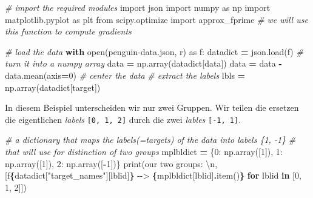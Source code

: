 \documentclass[
]{book}
\newenvironment{Shaded}{\begin{snugshade}}{\end{snugshade}}
\newcommand{\BuiltInTok}[1]{#1}
\newcommand{\CharTok}[1]{\textcolor[rgb]{0.31,0.60,0.02}{#1}}
\newcommand{\CommentTok}[1]{\textcolor[rgb]{0.56,0.35,0.01}{\textit{#1}}}
\newcommand{\ControlFlowTok}[1]{\textcolor[rgb]{0.13,0.29,0.53}{\textbf{#1}}}
\newcommand{\DecValTok}[1]{\textcolor[rgb]{0.00,0.00,0.81}{#1}}
\newcommand{\ImportTok}[1]{#1}
\newcommand{\KeywordTok}[1]{\textcolor[rgb]{0.13,0.29,0.53}{\textbf{#1}}}
\newcommand{\NormalTok}[1]{#1}
\newcommand{\OperatorTok}[1]{\textcolor[rgb]{0.81,0.36,0.00}{\textbf{#1}}}
\newcommand{\SpecialCharTok}[1]{\textcolor[rgb]{0.81,0.36,0.00}{\textbf{#1}}}
\newcommand{\SpecialStringTok}[1]{\textcolor[rgb]{0.31,0.60,0.02}{#1}}
\newcommand{\StringTok}[1]{\textcolor[rgb]{0.31,0.60,0.02}{#1}}
\theoremstyle{definition}
\theoremstyle{definition}
\theoremstyle{definition}
\theoremstyle{definition}
\theoremstyle{remark}
\begin{document}
\begin{Shaded}
\begin{Highlighting}[]
\CommentTok{\# import the required modules}
\ImportTok{import}\NormalTok{ json}
\ImportTok{import}\NormalTok{ numpy }\ImportTok{as}\NormalTok{ np}
\ImportTok{import}\NormalTok{ matplotlib.pyplot }\ImportTok{as}\NormalTok{ plt}
\ImportTok{from}\NormalTok{ scipy.optimize }\ImportTok{import}\NormalTok{ approx\_fprime  }\CommentTok{\# we will use this function to compute gradients}

\CommentTok{\# load the data}
\ControlFlowTok{with} \BuiltInTok{open}\NormalTok{(}\StringTok{\textquotesingle{}penguin{-}data.json\textquotesingle{}}\NormalTok{, }\StringTok{\textquotesingle{}r\textquotesingle{}}\NormalTok{) }\ImportTok{as}\NormalTok{ f:}
\NormalTok{    datadict }\OperatorTok{=}\NormalTok{ json.load(f)}
\CommentTok{\# turn it into a numpy array}
\NormalTok{data }\OperatorTok{=}\NormalTok{ np.array(datadict[}\StringTok{\textquotesingle{}data\textquotesingle{}}\NormalTok{])}
\NormalTok{data }\OperatorTok{=}\NormalTok{ data }\OperatorTok{{-}}\NormalTok{ data.mean(axis}\OperatorTok{=}\DecValTok{0}\NormalTok{)  }\CommentTok{\# center the data}
\CommentTok{\# extract the labels}
\NormalTok{lbls }\OperatorTok{=}\NormalTok{ np.array(datadict[}\StringTok{\textquotesingle{}target\textquotesingle{}}\NormalTok{])}
\end{Highlighting}
\end{Shaded}

In diesem Beispiel unterscheiden wir nur zwei Gruppen. Wir teilen die
ersetzen die eigentlichen \emph{labels} \texttt{{[}0,\ 1,\ 2{]}} durch die zwei \emph{lables} \texttt{{[}-1,\ 1{]}}.

\begin{Shaded}
\begin{Highlighting}[]
\CommentTok{\# a dictionary that maps the labels(=targets) of the data into labels \{1, {-}1\}}
\CommentTok{\# that will use for distinction of two groups}
\NormalTok{mplbldict }\OperatorTok{=}\NormalTok{ \{}\DecValTok{0}\NormalTok{: np.array([}\DecValTok{1}\NormalTok{]),}
             \DecValTok{1}\NormalTok{: np.array([}\DecValTok{1}\NormalTok{]),}
             \DecValTok{2}\NormalTok{: np.array([}\OperatorTok{{-}}\DecValTok{1}\NormalTok{])\}}
\BuiltInTok{print}\NormalTok{(}\StringTok{\textquotesingle{}our two groups: }\CharTok{\textbackslash{}n}\StringTok{\textquotesingle{}}\NormalTok{, [}\SpecialStringTok{f\textquotesingle{}}\SpecialCharTok{\{}\NormalTok{datadict[}\StringTok{"target\_names"}\NormalTok{][lblid]}\SpecialCharTok{\}}\SpecialStringTok{ {-}{-}\textgreater{} }\SpecialCharTok{\{}\NormalTok{mplbldict[lblid]}\SpecialCharTok{.}\NormalTok{item()}\SpecialCharTok{\}}\SpecialStringTok{\textquotesingle{}} \ControlFlowTok{for}\NormalTok{ lblid }\KeywordTok{in}\NormalTok{ [}\DecValTok{0}\NormalTok{, }\DecValTok{1}\NormalTok{, }\DecValTok{2}\NormalTok{]])}
\end{Highlighting}
\end{Shaded}
\end{document}
